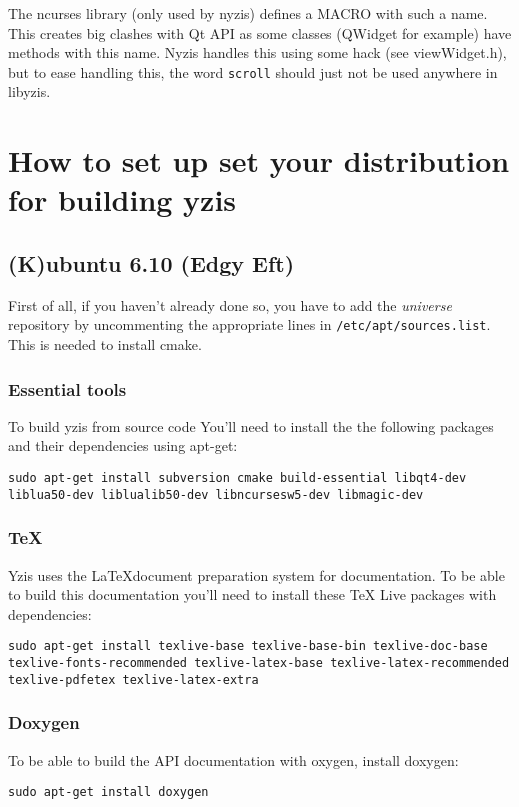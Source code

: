 \documentclass[a4paper,12pt]{report}
\begin{document}
The ncurses library (only used by nyzis) defines a MACRO with such a name.
This creates big clashes with Qt API as some classes (QWidget for example)
have methods with this name. Nyzis handles this using some hack (see
viewWidget.h), but to ease handling this, the word \verb+scroll+ should
just not be used anywhere in libyzis.

\appendix

\chapter{How to set up set your distribution for building yzis}

\section{(K)ubuntu 6.10 (Edgy Eft)}

First of all, if you haven't already done so, you have to add the
\emph{universe} repository by uncommenting the appropriate lines in
\texttt{/etc/apt/sources.list}. This is needed to install cmake.

\subsection{Essential tools}
To build yzis from source code You'll need to install the the following packages
and their dependencies using apt-get:

\texttt{sudo apt-get install subversion cmake build-essential libqt4-dev liblua50-dev
liblualib50-dev libncursesw5-dev libmagic-dev}

\subsection{\TeX}

Yzis uses the \LaTeX document preparation system for documentation. To be able
to build this documentation you'll need to install these \TeX{} Live packages
with dependencies:

\texttt{sudo apt-get install texlive-base texlive-base-bin texlive-doc-base
texlive-fonts-recommended texlive-latex-base texlive-latex-recommended
texlive-pdfetex texlive-latex-extra}

\subsection{Doxygen}
To be able to build the API documentation with oxygen, install doxygen:

\texttt{sudo apt-get install doxygen}
\end{document}
